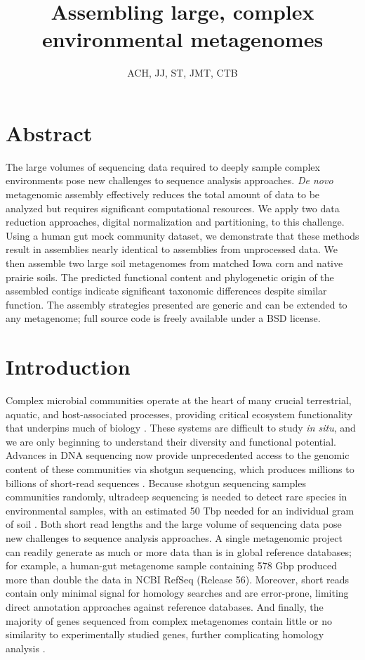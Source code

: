 \documentclass[11pt]{article} %
\begin{document}
\title{Assembling large, complex environmental metagenomes}
\author{ACH, JJ, ST, JMT, CTB} 
\maketitle

\section{Abstract}
The large volumes of sequencing data required to deeply sample complex
environments pose new challenges to sequence analysis approaches.
\emph{De novo} metagenomic assembly effectively reduces the total
amount of data to be analyzed but requires significant computational
resources.  We apply two data reduction approaches, digital
normalization and partitioning, to this challenge.  Using a human gut
mock community dataset, we demonstrate that these methods result in
assemblies nearly identical to assemblies from unprocessed data.  We
then assemble two large soil metagenomes from matched Iowa corn and
native prairie soils.  The predicted functional content and phylogenetic
origin of the assembled contigs indicate significant taxonomic
differences despite similar function.  The assembly strategies
presented are generic and can be extended to any metagenome; full
source code is freely available under a BSD
license.


\section{Introduction}  
Complex microbial communities operate at the heart of many crucial
terrestrial, aquatic, and host-associated processes, providing
critical ecosystem functionality that underpins much of biology
\cite{Arumugam:2011p735,Hess:2011p686,Iverson:2012p1281,
  Mackelprang:2011p1087,Qin:2010p189,Tringe:2005p174,Venter:2004p170}.
These systems are difficult to study {\em in situ}, and we are only
beginning to understand their diversity and functional potential.
Advances in DNA sequencing now provide unprecedented
access to the genomic content of these communities via shotgun
sequencing, which produces millions to billions of short-read
sequences \cite{Hess:2011p686,Mackelprang:2011p1087,Qin:2010p189}.
Because shotgun sequencing samples communities randomly, ultradeep
sequencing is needed to detect rare species in environmental samples,
with an estimated 50 Tbp needed for an individual gram of soil
\cite{Gans:2005p1365}.  Both short read lengths and the large volume
of sequencing data pose new challenges to sequence analysis
approaches.  A single metagenomic project can readily generate as much
or more data than is in global reference databases; for example, a
human-gut metagenome sample containing 578 Gbp \cite{Qin:2010p189}
produced more than double the data in NCBI RefSeq
(Release 56).  Moreover, short reads contain only minimal
signal for homology searches and are error-prone, limiting direct
annotation approaches against reference databases.  And finally, the
majority of genes sequenced from complex metagenomes contain little or no
similarity to experimentally studied genes, further complicating
homology analysis \cite{Arumugam:2011p735,Qin:2010p189}.
\end{document}
